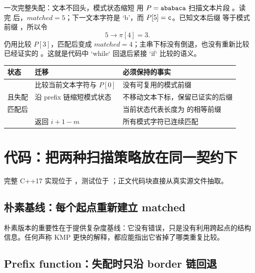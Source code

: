 \documentclass[UTF8,fontset=none,11pt,a4paper]{ctexart}
\begin{document}
\begin{examplebox}{一次完整失配：文本不回头，模式状态缩短}
用 $P=\texttt{ababaca}$ 扫描文本片段 。读完  后，$matched=5$；下一文本字符是 `b'，而 $P[5]=\texttt{c}$。已知文本后缀  等于模式前缀 ，所以令
\[
5\longrightarrow\pi[4]=3.
\]
仍用比较 $P[3]$，匹配后变成 $matched=4$；主串下标没有倒退，也没有重新比较已经证实的 。这就是代码中 `while` 回退后紧接 `if` 比较的语义。
\end{examplebox}

\begin{center}\small
\begin{tabularx}{\linewidth}{L{2.3cm}YY}
\toprule
状态 & 迁移 & 必须保持的事实\\
\midrule
{} & 比较当前文本字符与 $P[0]$ & 没有可复用的模式前缀\\
 且失配 & 沿 prefix 链缩短模式状态 & 不移动文本下标，保留已证实的后缀\\
匹配后 &  & 当前状态代表长度为  的相等前缀\\
 & 返回 $i+1-m$ & 所有模式字符已连续匹配\\
\bottomrule
\end{tabularx}
\end{center}

\section{代码：把两种扫描策略放在同一契约下}
完整 C++17 实现位于 ，测试位于 ；正文代码块直接从真实源文件抽取。

\subsection{朴素基线：每个起点重新建立 matched}


朴素版本的重要性在于提供复杂度基线：它没有错误，只是没有利用跨起点的结构信息。任何声称 KMP 更快的解释，都应能指出它省掉了哪类重复比较。

\subsection{Prefix function：失配时只沿 border 链回退}

\end{document}
